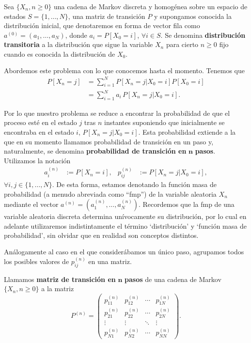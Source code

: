 Sea $\{X_n, n\geq 0\}$ una cadena de Markov discreta y homogénea sobre un espacio de estados $S=\{1,\dots,N\}$, una matriz de transición $P$ y supongamos conocida la distribución inicial, que denotaremos en forma de vector fila como $a^{(0)} = (a_1, \dots, a_N)$, donde $a_i = P[X_0 = i]$, $\forall i \in S$. Se denomina \textbf{distribución transitoria} a la distribución que sigue la variable $X_n$ para cierto $n\geq 0$ fijo cuando es conocida la distribución de $X_0$.

Abordemos este problema con lo que conocemos hasta el momento. Tenemos que
\begin{equation}
    \label{eq:distr-trans}
    \begin{split}
        P[X_n = j] &= \sum_{i=1}^N P[X_n=j|X_0 = i]P[X_0=i] \\
        &= \sum_{i=1}^Na_i \, P[X_n=j|X_0 = i].
    \end{split}
\end{equation}

Por lo que nuestro problema se reduce a encontrar la probabilidad de que el proceso esté en el estado $j$ tras $n$ instantes suponiendo que inicialmente se encontraba en el estado $i$, $P[X_n=j|X_0 = i]$. Esta probabilidad extiende a la que en su momento llamamos probabilidad de transición en un paso y, naturalmente, se denomina \textbf{probabilidad de transición en }$\mathbf{n}$ \textbf{pasos}. Utilizamos la notación  
\begin{align*}
    a_i^{(n)} &:= P[X_n=i], & p_{ij}^{(n)} &:= P[X_{n}=j|X_0=i],
\end{align*}
$\forall i,j \in \{1,\dots,N\}$. De esta forma, estamos denotando la función masa de probabilidad (a menudo abreviada como ``fmp'') de la variable aleatoria $X_n$ mediante el vector $a^{(n)}=(a_1^{(n)},\dots,a_N^{(n)})$. Recordemos que la fmp de una variable aleatoria discreta determina unívocamente su distribución, por lo cual en adelante utilizaremos indistintamente el término `distribución' y `función masa de probabilidad', sin olvidar que en realidad son conceptos distintos. 

Análogamente al caso en el que considerábamos un único paso, agrupamos todos los posibles valores de $p_{ij}^{(n)}$ en una matriz.

\begin{definicion}
    Llamamos \textbf{matriz de transición en }$\mathbf{n}$ \textbf{pasos} de una cadena de Markov $\{X_n, n\geq 0\}$ a la matriz
    \begin{equation}
        \label{eq:matriz-trans-n}
        P^{(n)}=\begin{pmatrix}
          p_{11}^{(n)} & p_{12}^{(n)} & \cdots & p_{1N}^{(n)} \\
          p_{21}^{(n)} & p_{22}^{(n)} & \cdots & p_{2N}^{(n)} \\
          \vdots & \vdots & \ddots & \vdots \\
          p_{N1}^{(n)} & p_{N2}^{(n)} & \cdots & p_{NN}^{(n)}  
        \end{pmatrix}.
    \end{equation}
\end{definicion}

